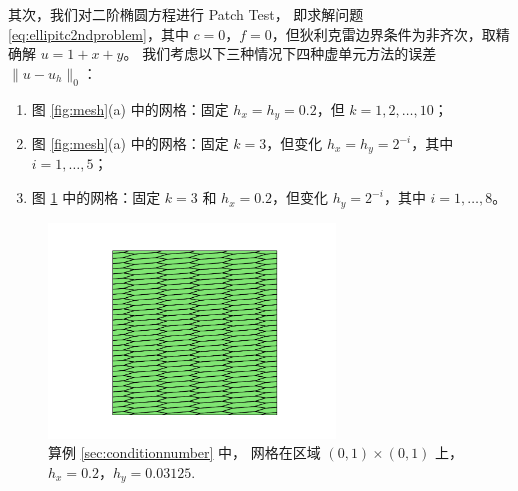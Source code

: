 其次，我们对二阶椭圆方程进行 Patch Test，
即求解问题 \eqref{eq:ellipitc2ndproblem}，其中 $c =
0$，$f=0$，但狄利克雷边界条件为非齐次，取精确解 $u = 1+x+y$。
我们考虑以下三种情况下四种虚单元方法的误差 $\|u - u_h\|_0$：
\begin{enumerate}[(1)]
\item 图 \ref{fig:mesh}(a) 中的网格：固定 $h_x = h_y = 0.2$，但 $k=1, 2, \ldots, 10$；
\item 图 \ref{fig:mesh}(a) 中的网格：固定 $k=3$，但变化 $h_x = h_y = 2^{-i}$，其中 $i=1, \ldots, 5$；
\item 图 \ref{fig:polymeshhy} 中的网格：固定 $k=3$ 和 $h_x=0.2$，但变化 $h_y = 2^{-i}$，其中 $i=1, \ldots, 8$。
\end{enumerate}

\begin{figure}[htp]
\centering
\includegraphics[width=3in]{./figures/stabfree/mesh_hy.pdf}
\caption{算例 \ref{sec:conditionnumber} 中，
网格在区域 $(0, 1) \times (0, 1)$ 上，$h_x = 0.2$，$h_y = 0.03125$.}
\label{fig:polymeshhy}
\end{figure}

